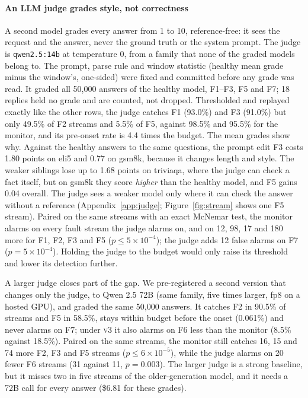 \documentclass{article}
\newcommand{\vthree}{\textsc{v3}}
\begin{document}
\paragraph{An LLM judge grades style, not correctness}
\label{sec:judge}
A second model grades every answer from 1 to 10, reference-free: it sees the
request and the answer, never the ground truth or the system prompt. The judge is
\texttt{qwen2.5:14b} at temperature 0, from a family that none of the graded
models belong to. The prompt, parse rule and window statistic (healthy mean grade
minus the window's, one-sided) were fixed and committed before any grade was read.
It graded all 50{,}000 answers of the healthy model, F1--F3, F5 and F7; 18 replies
held no grade and are counted, not dropped. Thresholded and replayed exactly like
the other rows, the judge catches F1 (93.0\%) and F3 (91.0\%) but only 49.5\% of
F2 streams and 5.5\% of F5, against 98.5\% and 95.5\% for the monitor, and its
pre-onset rate is 4.4 times the budget. The mean grades show why. Against the
healthy answers to the same questions, the prompt edit F3 costs 1.80 points on
\textsf{eli5} and 0.77 on \textsf{gsm8k}, because it changes length and style. The
weaker siblings lose up to 1.68 points on \textsf{triviaqa}, where the judge can
check a fact itself, but on \textsf{gsm8k} they score \emph{higher} than the healthy
model, and F5 gains 0.04 overall. The judge sees a weaker model only where it can
check the answer without a reference (Appendix~\ref{app:judge};
Figure~\ref{fig:stream} shows one F5 stream). Paired on the same streams with an
exact McNemar test, the monitor alarms on every fault stream the judge alarms on,
and on 12, 98, 17 and 180 more for F1, F2, F3 and F5 ($p\le 5\times10^{-4}$); the
judge adds 12 false alarms on F7 ($p=5\times10^{-4}$). Holding the judge to the
budget would only raise its threshold and lower its detection further.

A larger judge closes part of the gap. We pre-registered a second version that
changes only the judge, to Qwen 2.5 72B (same family, five times larger, fp8 on a
hosted GPU), and graded the same 50{,}000 answers. It catches F2 in 90.5\% of
streams and F5 in 58.5\%, stays within budget before the onset (0.061\%) and never
alarms on F7; under \vthree{} it also alarms on F6 less than the monitor (8.5\%
against 18.5\%). Paired on the same streams, the monitor still catches 16, 15 and
74 more F2, F3 and F5 streams ($p\le 6\times10^{-5}$), while the judge alarms on
20 fewer F6 streams (31 against 11, $p=0.003$). The larger judge is a strong
baseline, but it misses two in five streams of the older-generation model, and it
needs a 72B call for every answer (\$6.81 for these grades).
\end{document}

